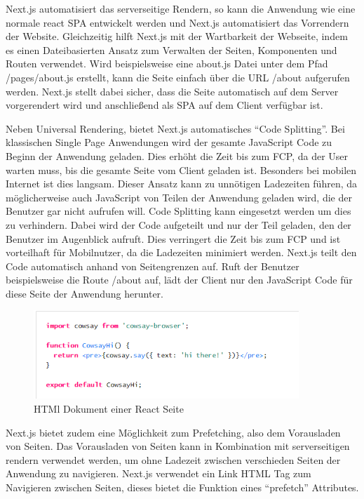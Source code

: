 \documentclass[runningheads]{llncs}
\begin{document}
Next.js automatisiert das serverseitige Rendern, 
so kann die Anwendung wie eine normale react SPA entwickelt werden und 
Next.js automatisiert das Vorrendern der Website. 
Gleichzeitig hilft Next.js mit der Wartbarkeit der Webseite, 
indem es einen Dateibasierten Ansatz zum Verwalten der Seiten, 
Komponenten und Routen verwendet. 
Wird beispielsweise eine about.js Datei unter dem Pfad /pages/about.js erstellt, 
kann die Seite einfach über die URL /about aufgerufen werden. 
Next.js stellt dabei sicher, 
dass die Seite automatisch auf dem Server vorgerendert wird und 
anschließend als SPA auf dem Client verfügbar ist. 

Neben Universal Rendering, bietet Next.js automatisches “Code Splitting”. 
Bei klassischen Single Page Anwendungen wird der gesamte JavaScript Code 
zu Beginn der Anwendung geladen. 
Dies erhöht die Zeit bis zum FCP, da der User warten muss, 
bis die gesamte Seite vom Client geladen ist. 
Besonders bei mobilen Internet ist dies langsam. 
Dieser Ansatz kann zu unnötigen Ladezeiten führen, 
da möglicherweise auch JavaScript von Teilen der Anwendung geladen wird, 
die der Benutzer gar nicht aufrufen will. 
Code Splitting kann eingesetzt werden um dies zu verhindern. 
Dabei wird der Code aufgeteilt und nur der Teil geladen, 
den der Benutzer im Augenblick aufruft. 
Dies verringert die Zeit bis zum FCP und ist vorteilhaft für Mobilnutzer, 
da die Ladezeiten minimiert werden.
Next.js teilt den Code automatisch anhand von Seitengrenzen auf. 
Ruft der Benutzer beispielsweise die Route /about auf, 
lädt der Client nur den JavaScript Code für diese Seite der Anwendung herunter.
\begin{figure}
  \centering
  \includegraphics[width=10cm]{images/CodeSplitting}
  \caption{HTMl Dokument einer React Seite}
\end{figure}
Next.js bietet zudem eine Möglichkeit zum Prefetching, 
also dem Vorausladen von Seiten. 
Das Vorausladen von Seiten kann in Kombination mit serverseitigen rendern verwendet werden, 
um ohne Ladezeit zwischen verschieden Seiten der Anwendung zu navigieren. 
Next.js verwendet ein Link HTML Tag zum Navigieren zwischen Seiten, 
dieses bietet die Funktion eines “prefetch” Attributes. 
\end{document}
